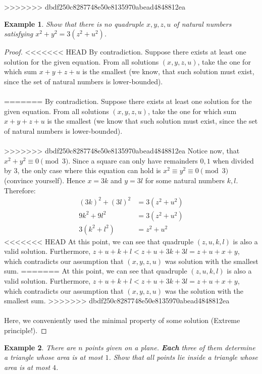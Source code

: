 \documentclass{article}
\newtheorem{theorem}{Example}
\begin{document}
\break
>>>>>>> dbdf250c8287748e50e8135970abead4848812ea

\begin{theorem}
Show that there is no quadruple $x, y, z, u$ of natural numbers satisfying
$x^{2} + y^{2} = 3(z^{2} + u^{2})$.
\end{theorem}

\begin{proof}
<<<<<<< HEAD
By contradiction. Suppose there exists at least one solution for the given equation. From all solutions $(x, y, z, u)$, take the one for which sum $x + y + z + u$ is the smallest (we know, that such solution must exist, since the set of natural numbers is lower-bounded). \\\\
=======
By contradiction. Suppose there exists at least one solution for the given equation. From all solutions $(x, y, z, u)$, take the one for which sum $x + y + z + u$ is the smallest (we know that such solution must exist, since the set of natural numbers is lower-bounded). \\\\
>>>>>>> dbdf250c8287748e50e8135970abead4848812ea
Notice now, that $x^{2} + y^{2} \equiv 0 \pmod 3$. Since a square can only have remainders $0, 1$ when divided by $3$, the only case where this equation can hold is $x^{2} \equiv y^{2} \equiv 0 \pmod 3$ (convince yourself). Hence $x = 3k$ and $y = 3l$ for some natural numbers $k, l$. \\
Therefore:
\begin{align*}
{(3k)}^{2} + {(3l)}^{2} &= 3(z^{2} + u^{2})\\
9k^{2} + 9l^{2} &= 3(z^{2} + u^{2}) \\
3(k^{2} + l^{2}) &= z^{2} + u^{2}
\end{align*}
<<<<<<< HEAD
At this point, we can see that quadruple $(z, u, k, l)$ is also a valid solution. Furthermore, $z + u + k + l < z + u + 3k + 3l = z + u + x + y$, which contradicts our assumption that $(x, y, z, u)$ was solution with the smallest sum. \qedhere
=======
At this point, we can see that quadruple $(z, u, k, l)$ is also a valid solution. Furthermore, $z + u + k + l < z + u + 3k + 3l = z + u + x + y$, which contradicts our assumption that $(x, y, z, u)$ was the solution with the smallest sum. \qedhere
>>>>>>> dbdf250c8287748e50e8135970abead4848812ea
\\\\
Here, we conveniently used the minimal property of some solution (Extreme principle!).
\end{proof}
\newpage
\begin{theorem}
There are $n$ points given on a plane. \textbf{Each} three of them determine a triangle whose area is at most $1$. Show that all points lie inside a triangle whose area is at most $4$.
\end{theorem}
\end{document}
